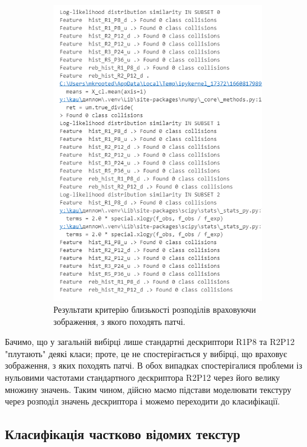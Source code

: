\begin{figure}[h]
\begin{subfigure}{0.48\textwidth}
    \includegraphics[width=0.9\linewidth]{img/distr-sim-subsets.png}
    \caption{
        Результати критерію близькості розподілів враховуючи зображення, з якого походять патчі. 
    }
    \label{fig:distr-sim-subsets}
    \end{subfigure}
    
    \caption{}
    \label{fig:distr-sim}
\end{figure}

Бачимо, що у загальній вибірці лише стандартні дескриптори R1P8 та R2P12 "плутають" деякі класи; 
проте, це не спостерігається у вибірці, що враховує зображення, з яких походять патчі.
В обох випадках спостерігалися проблеми із нульовими частотами стандартного дескриптора R2P12 через його велику множину значень.
Таким чином, дійсно маємо підстави моделювати текстуру через розподіл значень дескриптора і можемо переходити до класифікації.

\subsection{Класифікація частково відомих текстур}\label{section2.1d}

